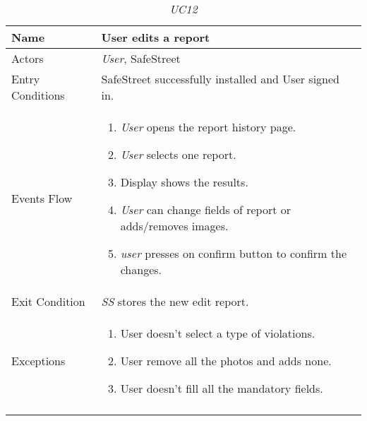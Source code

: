 \documentclass[../../../RASD.tex]{subfiles}
\begin{document}
    \begin{center}
        \begin{longtable}{| p{.35\linewidth} | p{.65\linewidth} |}
            \hline
            \textbf{Name} & \textbf{User edits a report}\\ \hline
            Actors & \textit{User}, SafeStreet\\ \hline
            Entry Conditions & SafeStreet successfully installed and User signed in.\\ \hline
            Events Flow &
            \begin{enumerate}
                \item \textit{User} opens the report history page.
                \item \textit{User} selects one report.
                \item  Display shows the results.
                \item \textit{User} can change fields of report or adds/removes images.
                \item \textit{user} presses on confirm button to confirm the changes.
            \end{enumerate}
            \\ \hline
            Exit Condition & \textit{SS} stores the new edit report.\\ \hline
            Exceptions &
            \begin{enumerate}
                \item User doesn’t select a type of violations.
                \item User remove all the photos and adds none.
                \item User doesn’t fill all the mandatory fields.
            \end{enumerate}
            \\
            \hline
            \caption[\textit{Use Case 12}]{\textit{UC12}}
        \end{longtable}
    \end{center}
\newpage
\end{document}
